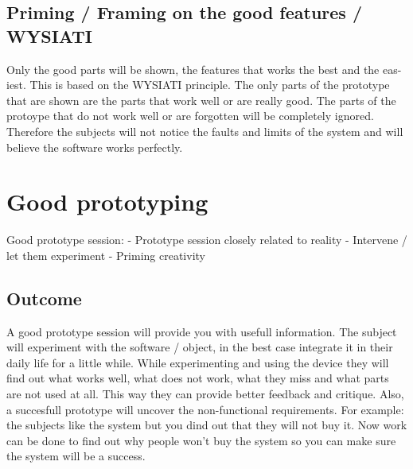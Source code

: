 \documentclass{article}
\begin{document}
\subsection{Priming / Framing on the good features / WYSIATI}
Only the good parts will be shown, the features that works the best and the eas-
iest. This is based on the WYSIATI principle. The only parts of the prototype
that are shown are the parts that work well or are really good. The parts of
the protoype that do not work well or are forgotten will be completely ignored.
Therefore the subjects will not notice the faults and limits of the system
and will believe the software works perfectly.


\section{Good prototyping}

Good prototype session:
- Prototype session closely related to reality
- Intervene / let them experiment
- Priming creativity 

 
\subsection{Outcome}
A good prototype session will provide you with usefull information. The subject
will experiment with the software / object, in the best case integrate it in their
daily life for a little while. While experimenting and using the device they will
find out what works well, what does not work, what they miss and what parts
are not used at all. This way they can provide better feedback and critique.
Also, a succesfull prototype will uncover the non-functional requirements.
For example: the subjects like the system but you dind out that they will not
buy it. Now work can be done to find out why people won't buy the system so you can make sure the system will be a success.





\end{document}
